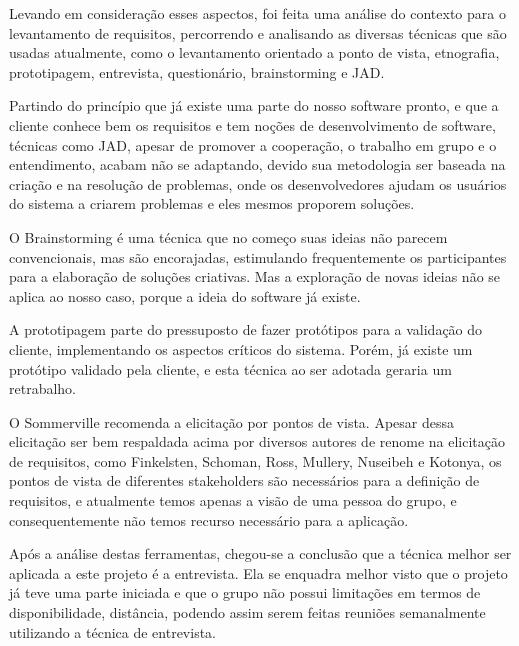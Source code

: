 Levando em consideração esses aspectos, foi feita uma análise do contexto para o levantamento de requisitos, percorrendo e analisando as diversas técnicas que são usadas atualmente, como o levantamento orientado a ponto de vista, etnografia, prototipagem, entrevista, questionário, brainstorming e JAD.

Partindo do princípio que já existe uma parte do nosso software pronto, e que a cliente conhece bem os requisitos e tem noções de desenvolvimento de software, técnicas como JAD, apesar de promover a cooperação, o trabalho em grupo e o entendimento, acabam não se adaptando, devido sua metodologia ser baseada na criação e na resolução de problemas, onde os desenvolvedores ajudam os usuários do sistema a criarem problemas e eles mesmos proporem soluções. \cite{moraes}

O Brainstorming é uma técnica que no começo suas ideias não parecem convencionais, mas são encorajadas, estimulando frequentemente os participantes para a elaboração de soluções criativas. Mas a exploração de novas ideias não se aplica ao nosso caso, porque a ideia do software já existe. \cite{moraes}

A prototipagem parte do pressuposto de fazer protótipos para a validação do cliente, implementando os aspectos críticos do sistema. Porém, já existe um protótipo validado pela cliente, e esta técnica ao ser adotada geraria um retrabalho.

O Sommerville recomenda a elicitação por pontos de vista. Apesar dessa elicitação ser bem respaldada acima por diversos autores de renome na elicitação de requisitos, como Finkelsten, Schoman, Ross, Mullery, Nuseibeh e Kotonya, os pontos de vista de diferentes stakeholders são necessários para a definição de requisitos, e atualmente temos apenas a visão de uma pessoa do grupo, e consequentemente não temos recurso necessário para a aplicação.

Após a análise destas ferramentas, chegou-se a conclusão que a  técnica melhor ser aplicada a este projeto é a entrevista. Ela se enquadra melhor visto que o projeto já teve uma parte iniciada e que o grupo não possui limitações em termos de disponibilidade, distância, podendo assim serem feitas reuniões semanalmente utilizando a técnica de entrevista.
